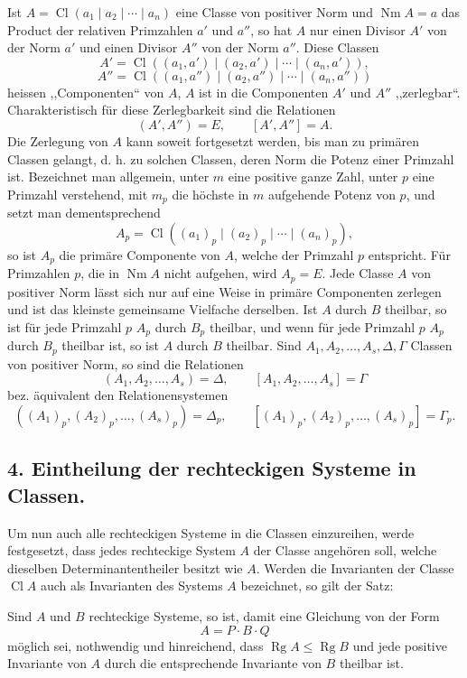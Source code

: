 \documentclass[11pt,a4paper]{article}
\newcommand{\Cl}{\operatorname{Cl}}
\newcommand{\Nm}{\operatorname{Nm}}
\newcommand{\Rg}{\operatorname{Rg}}
\begin{document}
Ist $A=\Cl(a_1\mid a_2\mid\cdots\mid a_n)$ eine Classe von positiver Norm und $\Nm A=a$ das Product der relativen Primzahlen $a'$ und $a''$, so hat $A$ nur einen Divisor $A'$ von der Norm $a'$ und einen Divisor $A''$ von der Norm $a''$. Diese Classen
\[
 A'=\Cl((a_1,a')\mid(a_2,a')\mid\cdots\mid(a_n,a')),
\]
\[
 A''=\Cl((a_1,a'')\mid(a_2,a'')\mid\cdots\mid(a_n,a''))
\]
heissen ,,Componenten`` von $A$, $A$ ist in die Componenten $A'$ und $A''$ ,,zerlegbar``. Charakteristisch für diese Zerlegbarkeit sind die Relationen
\[
 (A',A'')=E,
 \qquad [A',A'']=A.
\]
Die Zerlegung von $A$ kann soweit fortgesetzt werden, bis man zu primären Classen gelangt, d. h. zu solchen Classen, deren Norm die Potenz einer Primzahl ist. Bezeichnet man allgemein, unter $m$ eine positive ganze Zahl, unter $p$ eine Primzahl verstehend, mit $m_p$ die höchste in $m$ aufgehende Potenz von $p$, und setzt man dementsprechend
\[
 A_p=\Cl((a_1)_p\mid(a_2)_p\mid\cdots\mid(a_n)_p),
\]
so ist $A_p$ die primäre Componente von $A$, welche der Primzahl $p$ entspricht. Für Primzahlen $p$, die in $\Nm A$ nicht aufgehen, wird $A_p=E$. Jede Classe $A$ von positiver Norm lässt sich nur auf eine Weise in primäre Componenten zerlegen und ist das kleinste gemeinsame Vielfache derselben. Ist $A$ durch $B$ theilbar, so ist für jede Primzahl $p$ $A_p$ durch $B_p$ theilbar, und wenn für jede Primzahl $p$ $A_p$ durch $B_p$ theilbar ist, so ist $A$ durch $B$ theilbar. Sind $A_1,A_2,\ldots,A_s,\Delta,\Gamma$ Classen von positiver Norm, so sind die Relationen
\[
 (A_1,A_2,\ldots,A_s)=\Delta,\qquad [A_1,A_2,\ldots,A_s]=\Gamma
\]
bez. äquivalent den Relationensystemen
\[
 ((A_1)_p,(A_2)_p,\ldots,(A_s)_p)=\Delta_p,
 \qquad [(A_1)_p,(A_2)_p,\ldots,(A_s)_p]=\Gamma_p .
\]

\subsection*{4. Eintheilung der rechteckigen Systeme in Classen.}

Um nun auch alle rechteckigen Systeme in die Classen einzureihen, werde festgesetzt, dass jedes rechteckige System $A$ der Classe angehören soll, welche dieselben Determinantentheiler besitzt wie $A$. Werden die Invarianten der Classe $\Cl A$ auch als Invarianten des Systems $A$ bezeichnet, so gilt der Satz:

Sind $A$ und $B$ rechteckige Systeme, so ist, damit eine Gleichung von der Form
\[
 A=P\cdot B\cdot Q
\]
möglich sei, nothwendig und hinreichend, dass $\Rg A\le \Rg B$ und jede positive Invariante von $A$ durch die entsprechende Invariante von $B$ theilbar ist.
\end{document}

